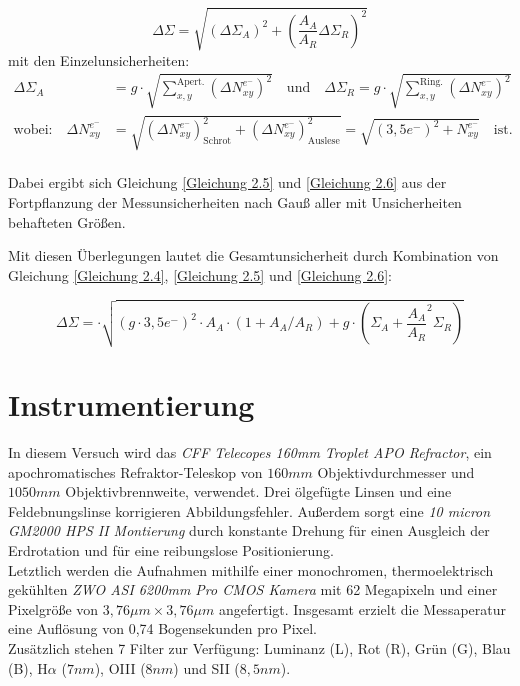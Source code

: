 \documentclass[ngerman,ruledheaders=section,class=report,thesis={type=Protokoll},accentcolor=1b,marginpar=false,parskip=half-,fontsize=11pt,]{tudapub}
\begin{document}
	\begin{equation}\label{Gleichung 2.5}
		\Delta \Sigma = \sqrt{\left( \Delta \Sigma_A\right)^2 + \left(  \frac{A_A}{A_R}\Delta \Sigma_R\right)^2}
	\end{equation}
	mit den Einzelunsicherheiten:
	\begin{equation}\label{Gleichung 2.6}
		\begin{aligned}
			\Delta \Sigma_A &= g \cdot \sqrt{\sum_{x,y}^{\text{Apert.}} \left( \Delta N_{xy}^{e^-} \right)^2 }
			\quad \text{und} 
			\quad
			\Delta \Sigma_R = g \cdot \sqrt{\sum_{x,y}^{\text{Ring.}}\left( \Delta N_{xy}^{e^-} \right)^2 }\\
			\text{wobei:} 
			\quad \Delta N_{xy}^{e^-} &= \sqrt{\left( \Delta N_{xy}^{e^-} \right)_{\text{Schrot}}^2 +
				\left( \Delta N_{xy}^{e^-}\right)_{\text{Auslese}}^2 } 
			=\sqrt{(3,5 e^-)^2 + N_{xy}^{e^-} } \quad \text{ist.}\\
		\end{aligned}
	\end{equation}
	
	Dabei ergibt sich Gleichung \ref{Gleichung 2.5} und \ref{Gleichung 2.6} aus der Fortpflanzung der Messunsicherheiten nach Gauß aller mit Unsicherheiten behafteten Größen. 
	
	Mit diesen Überlegungen lautet die Gesamtunsicherheit durch Kombination von Gleichung \ref{Gleichung 2.4}, \ref{Gleichung 2.5} und \ref{Gleichung 2.6}:
	
	\begin{equation}
		\Delta \Sigma = \cdot \sqrt{(g \cdot 3,5 e^-)^2 \cdot A_A \cdot (1 + A_A /A_R) + g \cdot \left( 
			\Sigma_A + \frac{A_A}{A_R}^2 \Sigma_R
			\right)}
	\end{equation}
	
	\section{Instrumentierung}
	In diesem Versuch wird das \glqq\textit{CFF Telecopes 160mm Troplet APO Refractor}\grqq, ein apochromatisches Refraktor-Teleskop von $160\si{mm}$ Objektivdurchmesser und $1050\si{mm}$ Objektivbrennweite, verwendet. Drei ölgefügte Linsen und eine Feldebnungslinse korrigieren Abbildungsfehler. Außerdem sorgt eine \textit{10 micron GM2000 HPS II Montierung} durch konstante Drehung für einen Ausgleich der Erdrotation und für eine reibungslose Positionierung. \\
	Letztlich werden die Aufnahmen mithilfe einer monochromen, thermoelektrisch gekühlten \textit{ZWO ASI 6200mm Pro CMOS Kamera} mit 62 Megapixeln und einer Pixelgröße von $3,76 \si{\mu m} \times 3,76 \si{\mu m}$ angefertigt. Insgesamt erzielt die Messaperatur eine Auflösung von 0,74 Bogensekunden pro Pixel. \\
	Zusätzlich stehen 7 Filter zur Verfügung: Luminanz (L), Rot (R), Grün (G), Blau (B), H$\alpha$ ($7\si{nm}$), OIII ($8\si{nm}$) und SII ($8,5\si{nm}$).
	
\end{document}
